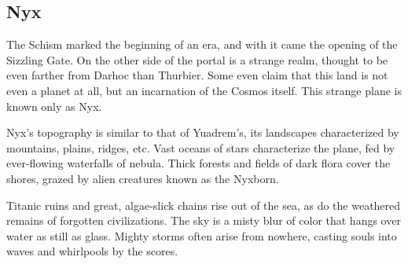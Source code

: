 
\vspace{12.0cm}

\subsection*{Nyx}
The Schism marked the beginning of an era, and with it came the opening of the Sizzling Gate.
On the other side of the portal is a strange realm, thought to be even farther from Darhoc than Thurbier.
Some even claim that this land is not even a planet at all, but an incarnation of the Cosmos itself.
This strange plane is known only as Nyx.

Nyx's topography is similar to that of Yuadrem's, its landscapes characterized by mountains, plains, ridges, etc.
Vast oceans of stars characterize the plane, fed by ever-flowing waterfalls of nebula.
Thick forests and fields of dark flora cover the shores, grazed by alien creatures known as the Nyxborn.

Titanic ruins and great, algae-slick chains rise out of the sea, as do the weathered remains of forgotten civilizations.
The sky is a misty blur of color that hangs over water as still as glass.
Mighty storms often arise from nowhere, casting souls into waves and whirlpools by the scores.

